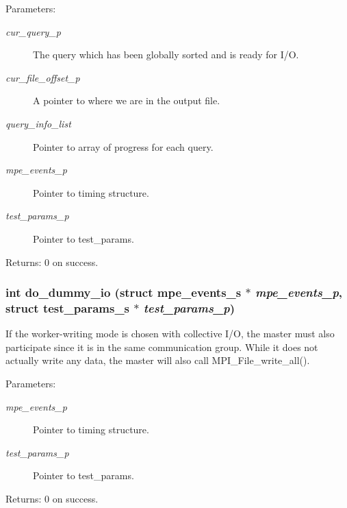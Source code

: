 \begin{Desc}
\item[Parameters:]
\begin{description}
\item[{\em cur\_\-query\_\-p}]The query which has been globally sorted and is ready for I/O. \item[{\em cur\_\-file\_\-offset\_\-p}]A pointer to where we are in the output file. \item[{\em query\_\-info\_\-list}]Pointer to array of progress for each query. \item[{\em mpe\_\-events\_\-p}]Pointer to timing structure. \item[{\em test\_\-params\_\-p}]Pointer to test\_\-params. \end{description}
\end{Desc}
\begin{Desc}
\item[Returns:]0 on success. \end{Desc}
\subsubsection{\setlength{\rightskip}{0pt plus 5cm}int do\_\-dummy\_\-io (struct \bf{mpe\_\-events\_\-s} $\ast$ {\em mpe\_\-events\_\-p}, struct \bf{test\_\-params\_\-s} $\ast$ {\em test\_\-params\_\-p})}\label{master__help_8h_e231da1fc42ba547786bccfd1dae9c4e}


If the worker-writing mode is chosen with collective I/O, the master must also participate since it is in the same communication group. While it does not actually write any data, the master will also call MPI\_\-File\_\-write\_\-all().

\begin{Desc}
\item[Parameters:]
\begin{description}
\item[{\em mpe\_\-events\_\-p}]Pointer to timing structure. \item[{\em test\_\-params\_\-p}]Pointer to test\_\-params. \end{description}
\end{Desc}
\begin{Desc}
\item[Returns:]0 on success. \end{Desc}
